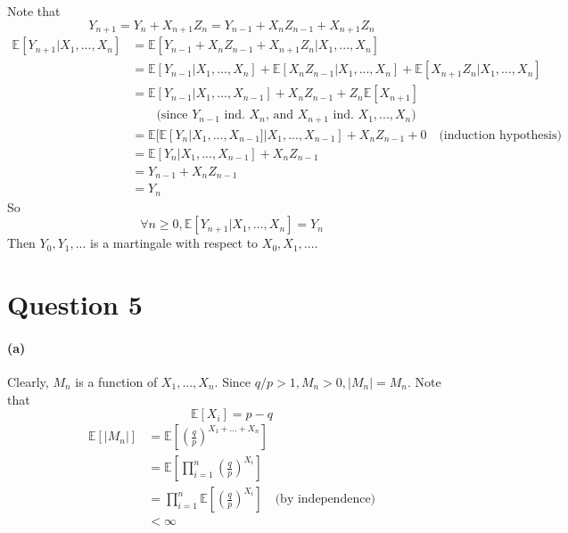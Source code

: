 \documentclass[11pt]{article} %
\begin{document}
Note that
\[Y_{n+1} = Y_n + X_{n+1} Z_n = Y_{n-1} + X_n Z_{n-1} + X_{n+1} Z_n\]
\begin{equation}
\begin{aligned}
\mathbb{E}[Y_{n+1}|X_1,...,X_n] &= \mathbb{E}[Y_{n-1} + X_n Z_{n-1} + X_{n+1}Z_n|X_1,...,X_n]\\
&= \mathbb{E}[Y_{n-1}|X_1,...,X_n] + \mathbb{E}[ X_n Z_{n-1}|X_1,...,X_n] + \mathbb{E}[X_{n+1}Z_n|X_1,...,X_n]\\
&= \mathbb{E}[Y_{n-1}|X_1,...,X_{n-1}] + X_n Z_{n-1} + Z_n\mathbb{E}[X_{n+1}]\\
&\quad\quad\text{(since $Y_{n-1}$ ind. $X_n$, and $X_{n+1}$ ind. $X_1,...,X_n$)}\\
&= \mathbb{E}[\mathbb{E}[Y_n|X_1,...,X_{n-1}]|X_1,...,X_{n-1}] + X_n Z_{n-1} + 0
\quad\text{(induction hypothesis)}\\
&= \mathbb{E}[Y_n|X_1,...,X_{n-1}]+ X_n Z_{n-1}\\
&= Y_{n-1} + X_n Z_{n-1}\\
&= Y_n
\end{aligned}
\end{equation}
So
\[\forall n\geq 0,\mathbb{E}[Y_{n+1}|X_1,...,X_n]=Y_n\]
Then $Y_0,Y_1,...$ is a martingale with respect to $X_0,X_1,...$.

\clearpage
\section*{Question 5}
\paragraph{(a)}
Clearly, $M_n$ is a function of $X_1,...,X_n$.
Since $q/p>1,M_n>0,|M_n|=M_n$. Note that 
\[\mathbb{E}[X_i] = p-q\]
\begin{equation}
\begin{aligned}  
\mathbb{E}[|M_n|]&=\mathbb{E}\left[\left(\frac{q}{p}\right)^{X_1+...+X_n}\right]\\
&=\mathbb{E}\left[\prod_{i=1}^n \left(\frac{q}{p}\right)^{X_i}\right]\\
&=\prod_{i=1}^n \mathbb{E}\left[ \left(\frac{q}{p}\right)^{X_i}\right] \quad\text{(by independence)}\\
&< \infty
\end{aligned}
\end{equation}
\end{document}
